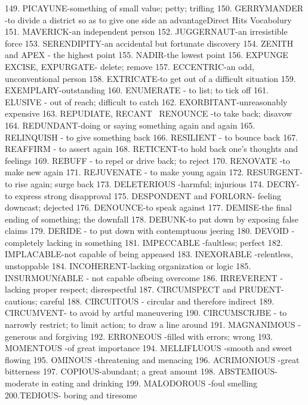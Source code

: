 \documentclass{exam}
\begin{document}
\begin{questions}
149. PICAYUNE-something of small value; petty; trifling
150. GERRYMANDER -to divide a district so as to give one side an advantageDirect Hits Vocabolury
151. MAVERICK-an independent person
152. JUGGERNAUT-an irresistible force
153. SERENDIPITY-an accidental but fortunate discovery
154. ZENITH and APEX - the highest point
155. NADIR-the lowest point
156. EXPUNGE~ EXCISE, EXPURGATE- delete; remove
157. ECCENTRIC-an odd, unconventional person
158. EXTRICATE-to get out of a difficult situation
159. EXEMPLARY-outstanding
160. ENUMERATE - to list; to tick off
161. ELUSIVE - out of reach; difficult to catch
162. EXORBITANT-unreasonably expensive
163. REPUDIATE, RECANT~ RENOUNCE -to take back; disavow
164. REDUNDANT-doing or saying something again and again
165. RELINQUISH - to give something back
166. RESILIENT - to bounce back
167. REAFFIRM - to assert again
168. RETICENT-to hold back one's thoughts and feelings
169. REBUFF - to repel or drive back; to reject
170. RENOVATE -to make new again
171. REJUVENATE - to make young again
172. RESURGENT-to rise again; surge back
173. DELETERIOUS -harmful; injurious
174. DECRY-to express strong disapproval
175. DESPONDENT and FORLORN- feeling downcast; dejected
176. DENOUNCE-to speak against
177. DEMISE-the final ending of something; the downfall
178. DEBUNK-to put down by exposing false claims
179. DERIDE - to put down with contemptuous jeering
180. DEVOID -completely lacking in something
181. IMPECCABLE -faultless; perfect
182. IMPLACABLE-not capable of being appeased
183. INEXORABLE -relentless, unstoppable
184. INCOHERENT-lacking organization or logic
185. INSURMOUNfABLE - not capable ofbeing overcome
186. IRREVERENT - lacking proper respect; disrespectful
187. CIRCUMSPECT and PRUDENT-cautious; careful
188. CIRCUITOUS - circular and therefore indirect
189. CIRCUMVENT- to avoid by artful maneuvering
190. CIRCUMSCRJBE - to narrowly restrict; to limit action; to draw a line around
191. MAGNANIMOUS -generous and forgiving
192. ERRONEOUS -filled with errors; wrong
193. MOMENTOUS -of great importance
194. MELLIFLUOUS -smooth and sweet flowing
195. OMINOUS -threatening and menacing
196. ACRIMONIOUS -great bitterness
197. COPIOUS-abundant; a great amount
198. ABSTEMIOUS-moderate in eating and drinking
199. MALODOROUS -foul smelling
200.TEDIOUS- boring and tiresome
\end{questions}
\end{document}
